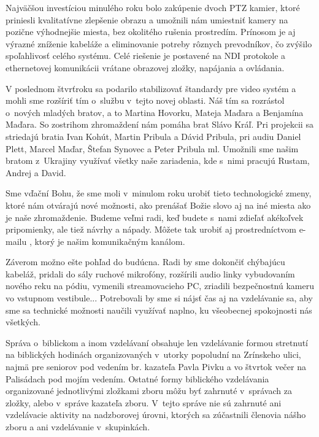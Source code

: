Najväčšou investíciou minulého roku bolo zakúpenie dvoch PTZ kamier, ktoré priniesli kvalitatívne zlepšenie obrazu a umožnili nám umiestniť kamery na pozične výhodnejšie miesta, bez okolitého rušenia prostredím. Prínosom je aj výrazné zníženie kabeláže a eliminovanie potreby rôznych prevodníkov, čo zvýšilo spoľahlivosť celého systému. Celé riešenie je postavené na NDI protokole a ethernetovej komunikácii vrátane obrazovej zložky, napájania a ovládania. 
 
V poslednom štvrťroku sa podarilo stabilizovať štandardy pre video systém a mohli sme rozšíriť tím o~službu v~tejto novej oblasti. Náš tím sa rozrástol o~nových mladých bratov, a to Martina Hovorku, Mateja Maďara a Benjamína Maďara. So zostrihom zhromaždení nám pomáha brat Slávo Kráľ. Pri projekcii sa striedajú bratia Ivan Kohút, Martin Pribula a Dávid Pribula, pri audiu Daniel Plett, Marcel Maďar, Štefan Synovec a Peter Pribula ml. Umožnili sme našim bratom z~Ukrajiny využívať všetky naše zariadenia, kde s~nimi pracujú Rustam, Andrej a David.

Sme vďační Bohu, že sme moli v~minulom roku urobiť tieto technologické zmeny, ktoré nám otvárajú nové možnosti, ako prenášať Božie slovo aj na iné miesta ako je naše zhromaždenie. Budeme veľmi radi, keď budete s~nami zdieľať akékoľvek pripomienky, ale tiež návrhy a nápady. Môžete tak urobiť aj prostredníctvom e-mailu , ktorý je našim komunikačným kanálom.

Záverom možno ešte pohľad do budúcna. Radi by sme dokončiť chýbajúcu kabeláž, pridali do sály ruchové mikrofóny, rozšírili audio linky vybudovaním nového reku na pódiu, vymenili streamovacieho PC, zriadili bezpečnostnú kameru vo vstupnom vestibule... Potrebovali by sme si nájsť čas aj na vzdelávanie sa, aby sme sa technické možnosti naučili využívať naplno, ku všeobecnej spokojnosti nás všetkých.



Správa o~biblickom a inom vzdelávaní obsahuje len vzdelávanie formou stretnutí na biblických hodinách organizovaných v~utorky popoludní na Zrínskeho ulici, najmä pre seniorov pod vedením br. kazateľa Pavla Pivku a vo štvrtok večer na Palisádach pod mojím vedením. Ostatné formy biblického vzdelávania organizované jednotlivými zložkami zboru môžu byť zahrnuté v~správach za zložky, alebo v~správe kazateľa zboru. V~tejto správe nie sú zahrnuté ani vzdelávacie aktivity na nadzborovej úrovni, ktorých sa zúčastnili členovia nášho zboru a ani vzdelávanie v~skupinkách.

